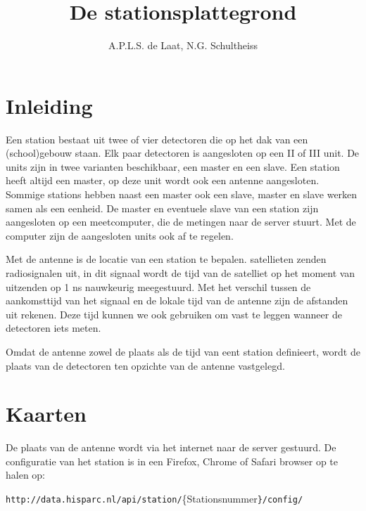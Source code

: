 

\title{De stationsplattegrond}
\author{A.P.L.S. de Laat, N.G. Schultheiss}



\maketitle

\section{Inleiding}

Een \hisparc station bestaat uit twee of vier detectoren die op het dak
van een (school)gebouw staan. Elk paar detectoren is aangesloten op een
\hisparc II of \hisparc III unit. De \hisparc units zijn in twee
varianten beschikbaar, een master en een slave. Een \hisparc station
heeft altijd een \hisparc master, op deze unit wordt ook een \gps antenne
aangesloten. Sommige stations hebben naast een master ook een slave,
master en slave werken samen als een eenheid. De master en eventuele
slave van een station zijn aangesloten op een meetcomputer, die de
metingen naar de \hisparc server stuurt. Met de computer zijn de
aangesloten units ook af te regelen.

Met de \gps antenne is de locatie van een station te bepalen.
\gps satellieten zenden radiosignalen uit, in dit signaal wordt de tijd
van de satelliet op het moment van uitzenden op 1 ns nauwkeurig meegestuurd.
Met het verschil tussen de aankomsttijd van het signaal en de lokale
tijd van de antenne zijn de afstanden uit rekenen. Deze tijd kunnen we
ook gebruiken om  vast te leggen wanneer de detectoren iets meten. 

Omdat de \gps antenne zowel de plaats als de tijd van eent station definieert,
wordt de plaats van de detectoren ten opzichte van de \gps antenne
vastgelegd.


\section{Kaarten}

De plaats van de \gps antenne wordt via het internet naar de \hisparc
server gestuurd. De configuratie van het station is in een Firefox,
Chrome of Safari browser op te halen op: 

\texttt{\small{http://data.hisparc.nl/api/station/}}{\small{\{Stationsnummer}}\texttt{\small{\}/config/}}{\small \par}

